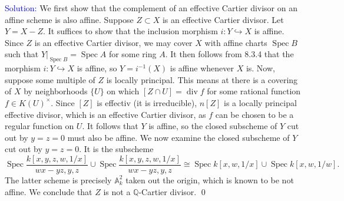 \documentclass[11pt]{article}
\renewcommand{\AA}{\mathbb{A}}
\newcommand{\QQ}{\mathbb{Q}}
\DeclareMathOperator{\Spec}{\operatorname{Spec}}
\newcommand{\Div}{\operatorname{div}}
\newenvironment{solution}{\begin{trivlist}\item[]{\textcolor{blue}{Solution:}}}{\qed \end{trivlist}}
\begin{document}
\begin{solution}
    We first show that the complement of an effective Cartier divisor on an affine scheme is also affine. Suppose $Z \subset X$ is an effective Cartier divisor. Let $Y = X - Z$. It suffices to show that the inclusion morphism $i: Y \hookrightarrow X$ is affine. Since $Z$ is an effective Cartier divisor, we may cover $X$ with affine charts $\Spec B$ such that $Y|_{\Spec B} = \Spec A$ for some ring $A$. It then follows from 8.3.4 that the morphism $i: Y \hookrightarrow X$ is affine, so $Y = i^{-1}(X)$ is affine whenever $X$ is. Now, suppose some multiple of $Z$ is locally principal. This means at there is a covering of $X$ by neighborhoods $\{U\}$ on which $[Z \cap U] = \Div f$ for some rational function $f \in K(U)^\times$. Since $[Z]$ is effectiv (it is irreducible), $n[Z]$ is a locally principal effective divisor, which is an effective Cartier divisor, as $f$ can be chosen to be a regular function on $U$. It follows that $Y$ is affine, so the closed subscheme of $Y$ cut out by $y = z = 0$ must also be affine. We now examine the closed subscheme of $Y$ cut out by $y = z = 0$. It is the subscheme 
    \begin{equation*}
        \Spec \frac{k[x,y,z,w, 1/x]}{wx - yz, y, z} \cup \Spec \frac{k[x,y,z,w, 1/x]}{wx - yz, y, z} 
        \cong \Spec k[x,w,1/x] \cup \Spec k[x,w,1/w].
    \end{equation*}
    The latter scheme is precisely $\AA_k^2$ taken out the origin, which is known to be not affine. We conclude that $Z$ is not a $\QQ$-Cartier divisor. 
\end{solution}
\end{document}

